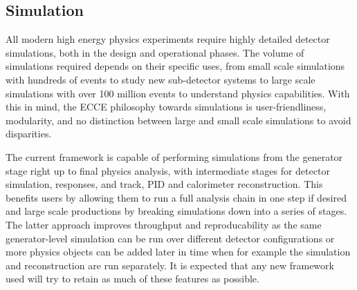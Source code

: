 \subsection{Simulation}






	All modern high energy physics experiments require highly detailed detector simulations, both in the design and operational phases. The volume of simulations required depends on their specific uses, from small scale simulations with hundreds of events to study new sub-detector systems to large scale simulations with over 100 million events to understand physics capabilities. With this in mind, the ECCE philosophy towards simulations is user-friendliness, modularity, and no distinction between large and small scale simulations to avoid disparities. 
	
	The current framework is capable of performing simulations from the generator stage right up to final physics analysis, with intermediate stages for detector simulation, responses, and track, PID and calorimeter reconstruction. This benefits users by allowing them to run a full analysis chain in one step if desired and large scale productions by breaking simulations down into a series of stages. The latter approach improves throughput and reproducability as the same generator-level simulation can be run over different detector configurations or more physics objects can be added later in time when for example the simulation and reconstruction are run separately. It is expected that any new framework used will try to retain as much of these features as possible.
	
